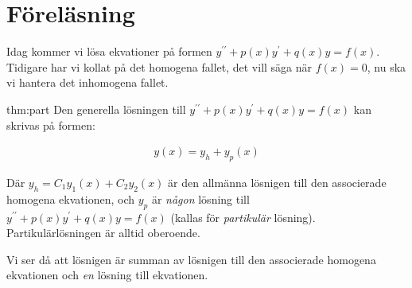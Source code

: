 \section{Föreläsning}
\noindent Idag kommer vi lösa ekvationer på formen $y^{\prime\prime}+p(x)y^{\prime}+q(x)y=f(x)$. Tidigare har vi kollat på det homogena fallet, det vill säga när $f(x) = 0$, nu ska vi hantera det inhomogena fallet.
\par\bigskip

\begin{theo}{thm:part}
  Den generella lösningen till $y^{\prime\prime}+p(x)y^{\prime}+q(x)y=f(x)$ kan skrivas på formen:

  \begin{equation*}
    \begin{gathered}
      y(x) = y_h+y_p(x)
    \end{gathered}
  \end{equation*}
  \par\bigskip
  \noindent Där $y_h = C_1y_1(x)+C_2y_2(x)$ är den allmänna lösnigen till den associerade homogena ekvationen, och $y_p$ är \textit{någon} lösning till $y^{\prime\prime}+p(x)y^{\prime}+q(x)y=f(x)$ (kallas för \textit{partikulär} lösning). Partikulärlösningen är alltid oberoende.
\end{theo}
\par\bigskip
\noindent Vi ser då att lösnigen är summan av lösnigen till den associerade homogena ekvationen och \textit{en} lösning till ekvationen.
\par\bigskip

